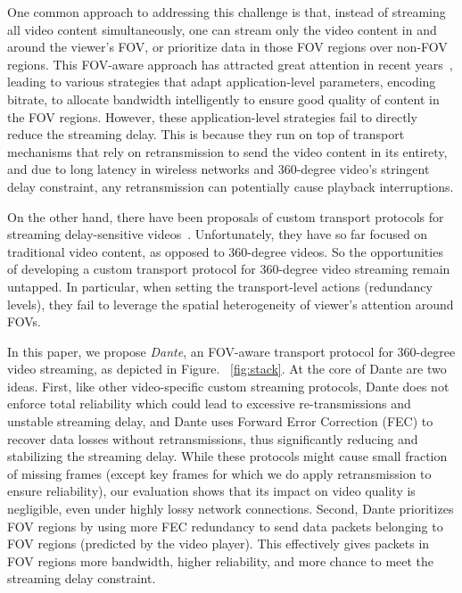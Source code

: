 One  common approach to addressing this challenge is that, 
instead of streaming all video content simultaneously, one can stream
only the video content in and around the viewer's FOV,
or prioritize data in those FOV regions over non-FOV regions. This 
FOV-aware approach has attracted great attention in recent 
years~\cite{Viewport-adaptive,360ProbDASH,Adaptive_Streaming_Framework,Two-tier,Omnidirectional_Video_over_HTTP}, 
leading to various strategies that adapt application-level 
parameters, \eg 
encoding bitrate, to allocate bandwidth intelligently 
to ensure good quality of content in the FOV regions. 
However, these application-level strategies 
fail  to directly reduce the streaming delay. This is because 
they run on top of transport mechanisms that rely on 
retransmission to send the video content in its entirety,
and due to long latency in wireless networks and 360-degree video's
stringent delay constraint, any retransmission
can potentially cause playback interruptions.

On the other hand, there have been proposals of custom transport 
protocols for streaming delay-sensitive videos~\cite{MPMTP,CMT-VR,ADMIT}. 
Unfortunately, they have so far focused on traditional video content, 
as opposed to 360-degree videos. So the opportunities of developing a 
custom transport protocol for 360-degree video streaming remain untapped.
In particular, when setting the transport-level actions (\eg redundancy
levels), they fail to leverage the spatial heterogeneity of 
viewer's attention around FOVs.

In this paper, we propose {\em Dante}, an FOV-aware transport protocol
for 360-degree video streaming, as depicted in Figure. ~\ref{fig:stack}. 
At the core of Dante are two ideas. First, like other video-specific custom streaming protocols, Dante does not enforce
total reliability which could lead to excessive re-transmissions and 
unstable streaming delay, 
and Dante uses Forward Error Correction (FEC) to recover data losses 
without retransmissions, thus significantly reducing and 
stabilizing the streaming delay.
While these protocols might cause small fraction of missing frames 
(except key frames for which we do apply retransmission to ensure 
reliability), our evaluation shows that its impact on video quality is 
negligible, even under highly lossy network connections. 
Second, Dante prioritizes FOV regions by using more FEC redundancy to 
send data packets belonging to FOV regions (predicted by the 
video player). This effectively gives packets in FOV regions more 
bandwidth, higher reliability, and more chance to meet the streaming 
delay constraint.

